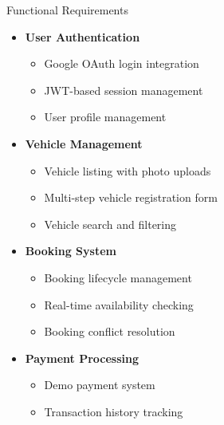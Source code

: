 \documentclass{beamer}
\begin{document}
\begin{frame}{Functional Requirements}
\begin{itemize}
    \item \textbf{User Authentication}
    \begin{itemize}
        \item Google OAuth login integration
        \item JWT-based session management
        \item User profile management
    \end{itemize}
    
    \item \textbf{Vehicle Management}
    \begin{itemize}
        \item Vehicle listing with photo uploads
        \item Multi-step vehicle registration form
        \item Vehicle search and filtering
    \end{itemize}
    
    \item \textbf{Booking System}
    \begin{itemize}
        \item Booking lifecycle management
        \item Real-time availability checking
        \item Booking conflict resolution
    \end{itemize}
    
    \item \textbf{Payment Processing}
    \begin{itemize}
        \item Demo payment system
        \item Transaction history tracking
    \end{itemize}
\end{itemize}
\end{frame}
\end{document}
